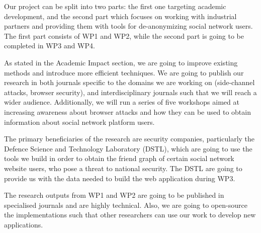 \documentclass[a4paper,11pt]{article}
\begin{document}
%
Our project can be split into two parts: the first one targeting academic development, and the second part which focuses on working with industrial partners and providing them with tools for de-anonymizing social network users. The first part consists of WP1 and WP2, while the second part is going to be completed in WP3 and WP4.

As stated in the Academic Impact section, we are going to improve existing methods and introduce more efficient techniques. We are going to publish our research in both journals specific to the domains we are working on (side-channel attacks, browser security), and interdisciplinary journals such that we will reach a wider audience. Additionally, we will run a series of five workshops aimed at increasing awareness about browser attacks and how they can be used to obtain information about social network platform users.

The primary beneficiaries of the research are security companies, particularly the Defence Science and Technology Laboratory (DSTL), which are going to use the tools we build in order to obtain the friend graph of certain social network website users, who pose a threat to national security. The DSTL are going to provide us with the data needed to build the web application during WP3.


The research outputs from WP1 and WP2 are going to be published in specialised journals and are highly technical. Also, we are going to open-source the implementations such that other researchers can use our work to develop new applications.

\end{document}
